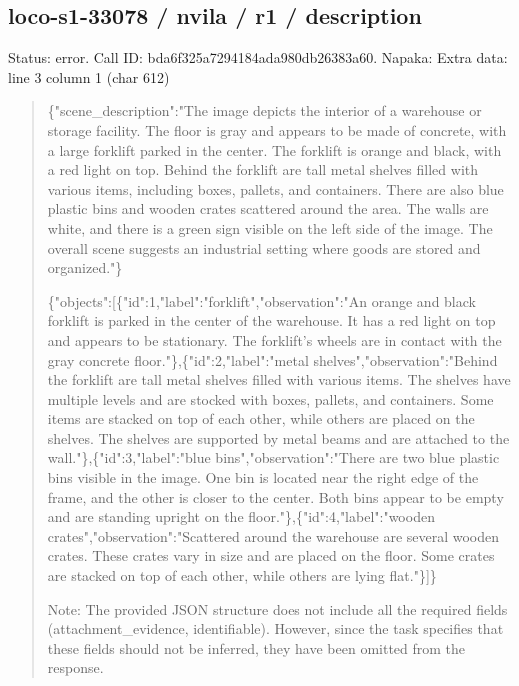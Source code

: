 \documentclass[10pt,a4paper]{article}
\begin{document}
\subsection*{loco-s1-33078 / nvila / r1 / description}
Status: error. Call ID: bda6f325a7294184ada980db26383a60. Napaka: Extra data: line 3 column 1 (char 612)
\begin{quote}\footnotesize
\{"scene\_description":\allowbreak{}"The image depicts the interior of a warehouse or storage facility. The floor is gray and appears to be made of concrete,\allowbreak{} with a large forklift parked in the center. The forklift is orange and black,\allowbreak{} with a red light on top. Behind the forklift are tall metal shelves filled with various items,\allowbreak{} including boxes,\allowbreak{} pallets,\allowbreak{} and containers. There are also blue plastic bins and wooden crates scattered around the area. The walls are white,\allowbreak{} and there is a green sign visible on the left side of the image. The overall scene suggests an industrial setting where goods are stored and organized."\}\par
\par
\{"objects":\allowbreak{}[\{"id":\allowbreak{}1,\allowbreak{}"label":\allowbreak{}"for\allowbreak{}klift",\allowbreak{}"observation":\allowbreak{}"An orange and black forklift is parked in the center of the warehouse. It has a red light on top and appears to be stationary. The forklift's wheels are in contact with the gray concrete floor."\},\allowbreak{}\{"id":\allowbreak{}2,\allowbreak{}"label":\allowbreak{}"metal shelves",\allowbreak{}"observation":\allowbreak{}"Behind the forklift are tall metal shelves filled with various items. The shelves have multiple levels and are stocked with boxes,\allowbreak{} pallets,\allowbreak{} and containers. Some items are stacked on top of each other,\allowbreak{} while others are placed on the shelves. The shelves are supported by metal beams and are attached to the wall."\},\allowbreak{}\{"id":\allowbreak{}3,\allowbreak{}"label":\allowbreak{}"blue bins",\allowbreak{}"observation":\allowbreak{}"There are two blue plastic bins visible in the image. One bin is located near the right edge of the frame,\allowbreak{} and the other is closer to the center. Both bins appear to be empty and are standing upright on the floor."\},\allowbreak{}\{"id":\allowbreak{}4,\allowbreak{}"label":\allowbreak{}"wooden\allowbreak{} crates",\allowbreak{}"observation":\allowbreak{}"Scattered\allowbreak{} around the warehouse are several wooden crates. These crates vary in size and are placed on the floor. Some crates are stacked on top of each other,\allowbreak{} while others are lying flat."\}]\}\par
\par
Note:\allowbreak{} The provided JSON structure does not include all the required fields (attachment\_evidence,\allowbreak{} identifiable). However,\allowbreak{} since the task specifies that these fields should not be inferred,\allowbreak{} they have been omitted from the response.
\end{quote}
\end{document}
